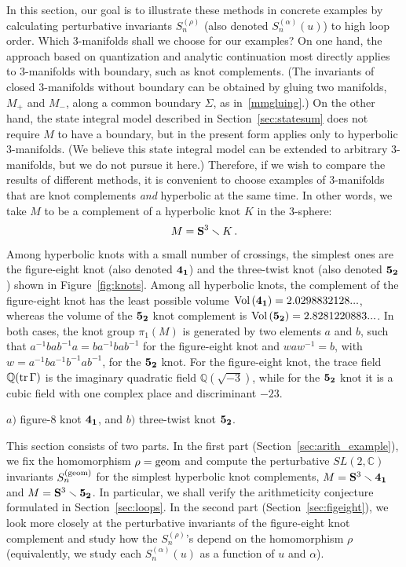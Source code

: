 \documentclass[hyper]{JHEP3}
\def\tr{{\rm tr\,}}
\newcommand{\C}{{\mathbb{C}}}
\newcommand\be{\begin{equation}}
\newcommand\ee{\end{equation}}
\newcommand{\Vol}{{\mbox{Vol\,}}}
\def\sm{\smallsetminus}
\begin{document}
In this section, our goal is to illustrate these methods in concrete examples
by calculating perturbative invariants $S_n^{(\rho)}$ (also denoted $S_n^{(\alpha)}(u)$)
to high loop order.
Which 3-manifolds shall we choose for our examples?
On one hand, the approach based on quantization and analytic continuation
most directly applies to 3-manifolds with boundary, such as knot complements.
(The invariants of closed 3-manifolds without boundary can be obtained
by gluing two manifolds, $M_+$ and $M_-$, along a common boundary $\Sigma$,
as in~\eqref{mmgluing}.)
On the other hand, the state integral model described in Section~\ref{sec:statesum}
does not require $M$ to have a boundary,
but in the present form applies only to hyperbolic 3-manifolds.
(We believe this state integral model can be extended to arbitrary 3-manifolds,
but we do not pursue it here.)
Therefore, if we wish to compare the results of different methods,
it is convenient to choose examples of 3-manifolds
that are knot complements {\it and} hyperbolic at the same time.
In other words, we take $M$ to be a complement of a hyperbolic knot $K$ in the 3-sphere:
\be
M = {\bf S}^3 \sm K\,.
\ee
Among hyperbolic knots with a small number of crossings,
the simplest ones are the figure-eight knot (also denoted ${\bf 4_1}$)
and the three-twist knot (also denoted ${\bf 5_2}$) shown in Figure~\ref{fig:knots}.
Among all hyperbolic knots, the complement of the figure-eight knot
has the least possible volume $\Vol ({\bf 4_1}) = 2.0298832128...$,
whereas the volume of the ${\bf 5_2}$ knot complement is $\Vol ({\bf 5_2}) = 2.8281220883...$.
In both cases, the knot group $\pi_1 (M)$ is generated by two elements $a$ and $b$,
such that $a^{-1} b a b^{-1} a = ba^{-1} ba b^{-1}$ for the figure-eight knot
and $waw^{-1}=b$, with $w = a^{-1} b a^{-1} b^{-1} a b^{-1}$, for the ${\bf 5_2}$ knot.
For the figure-eight knot, the trace field $\mathbb{Q}(\tr\Gamma)$
is the imaginary quadratic field $\mathbb{Q} (\sqrt{-3})$, while for the ${\bf 5_2}$ knot
it is a cubic field with one complex place and discriminant $-23$.

%
{$a)$ figure-8 knot ${\bf 4_1}$, and $b)$ three-twist knot ${\bf 5_2}$.
\label{fig:knots} }

This section consists of two parts.
In the first part (Section~\ref{sec:arith_example}), we fix the homomorphism $\rho = {\rm geom}$
and compute the perturbative $SL(2,\C)$ invariants $S_n^{({\rm geom})}$
for the simplest hyperbolic knot complements, $M = {\bf S}^3 \sm {\bf 4_1}$ and $M = {\bf S}^3 \sm {\bf 5_2}$.
In particular, we shall verify the arithmeticity conjecture formulated in Section~\ref{sec:loops}.
In the second part (Section~\ref{sec:figeight}),
we look more closely at the perturbative invariants of the figure-eight knot complement
and study how the $S_n^{(\rho)}$'s depend on the homomorphism $\rho$
(equivalently, we study each $S_n^{(\alpha)}(u)$ as a function of $u$ and $\alpha$).
\end{document}
